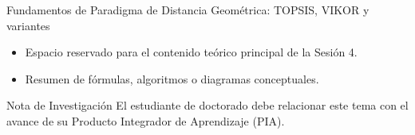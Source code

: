 \documentclass[aspectratio=169, 10pt]{beamer}
\begin{document}
\begin{frame}{Fundamentos de Paradigma de Distancia Geométrica: TOPSIS, VIKOR y variantes}
    \begin{itemize}
        \item Espacio reservado para el contenido teórico principal de la Sesión 4.
        \item Resumen de fórmulas, algoritmos o diagramas conceptuales.
    \end{itemize}
    \begin{block}{Nota de Investigación}
        El estudiante de doctorado debe relacionar este tema con el avance de su Producto Integrador de Aprendizaje (PIA).
    \end{block}
\end{frame}
\end{document}
